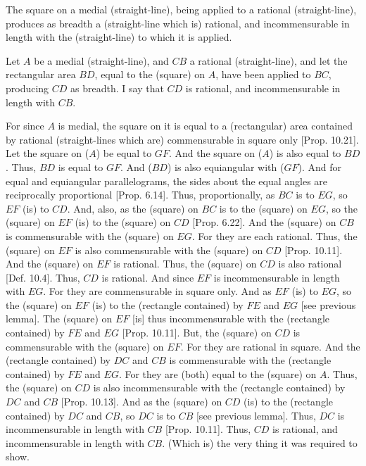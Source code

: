 \begin{Parallel}{}{}
{The square on a medial (straight-line), being
applied to a rational (straight-line), produces as breadth a (straight-line which
is) rational, and incommensurable in length with the (straight-line) to which it is applied.

\epsfysize=2in
\centerline{}

Let $A$ be a medial (straight-line), and $CB$ a rational (straight-line),
and let the rectangular area $BD$, equal to the (square) on $A$, have
been applied to $BC$, producing $CD$ as breadth. I say that
$CD$ is rational, and incommensurable in  length with $CB$.

For since $A$ is medial, the square on it is equal to a (rectangular) area
contained by rational (straight-lines which are) commensurable in square
only [Prop. 10.21]. Let the square on ($A$) be equal
to $GF$. And the square on ($A$) is also equal to $BD$. Thus, $BD$
is equal to $GF$. And ($BD$) is also equiangular with ($GF$). And for equal and
equiangular parallelograms, the sides about the equal angles are
reciprocally proportional [Prop. 6.14]. 
Thus, proportionally,  as $BC$ is to $EG$, so $EF$ (is) to $CD$.
And, also, as the (square) on $BC$ is to the (square) on $EG$, so
the (square) on $EF$ (is) to the (square) on $CD$ [Prop. 6.22]. 
And the (square) on $CB$ is commensurable with the (square) on $EG$.
For they are each rational. Thus, the (square) on $EF$ is also commensurable
with the (square) on $CD$ [Prop. 10.11]. And
the (square) on $EF$ is rational. Thus, the (square) on $CD$ is also rational
[Def. 10.4]. Thus, $CD$ is rational.
And since $EF$ is incommensurable in length with
$EG$. For they are commensurable in square only. And as $EF$ (is) to $EG$,
so the (square) on $EF$ (is) to the (rectangle contained) by $FE$ and $EG$ 
[see previous lemma]. The (square) on $EF$ [is] thus incommensurable with the (rectangle contained) by $FE$ and $EG$ [Prop. 10.11]. But, the (square) on $CD$
is commensurable with the (square) on $EF$. For they are rational
in square.
And the (rectangle contained) by $DC$ and $CB$ is commensurable
with the (rectangle contained) by $FE$ and $EG$. For they are (both)
equal to the (square) on $A$. Thus, the (square) on $CD$ is also
incommensurable with the (rectangle contained) by $DC$ and $CB$
[Prop. 10.13]. And as the (square) on $CD$
(is) to the (rectangle contained) by $DC$ and $CB$, so $DC$ is to $CB$ [see
previous lemma]. Thus, $DC$ is incommensurable in length with $CB$
[Prop. 10.11]. Thus, $CD$ is rational, and
incommensurable in length with $CB$. (Which is) the very thing it was required to show.}
\end{Parallel}


